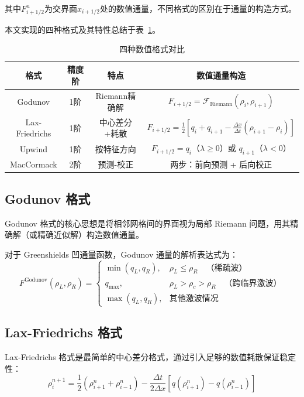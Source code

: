 \documentclass[12pt,a4paper]{ctexart}
\begin{document}
其中$F_{i+1/2}^n$为交界面$x_{i+1/2}$处的数值通量，不同格式的区别在于通量的构造方式。

本文实现的四种格式及其特性总结于表~\ref{tab:schemes}。

\begin{table}[H]
    \centering
    \caption{四种数值格式对比}
    \label{tab:schemes}
    \begin{tabular}{@{}cccc@{}}
        \toprule
        \textbf{格式} & \textbf{精度阶} & \textbf{特点} & \textbf{数值通量构造} \\
        \midrule
        Godunov & 1阶 & Riemann精确解 & $F_{i+1/2} = \mathcal{F}_{\text{Riemann}}(\rho_i, \rho_{i+1})$ \\
        Lax-Friedrichs & 1阶 & 中心差分+耗散 & $F_{i+1/2} = \frac{1}{2}[q_i+q_{i+1} - \frac{\Delta x}{\Delta t}(\rho_{i+1}-\rho_i)]$ \\
        Upwind & 1阶 & 按特征方向 & $F_{i+1/2} = q_i$（$\lambda \ge 0$）或 $q_{i+1}$（$\lambda < 0$） \\
        MacCormack & 2阶 & 预测-校正 & 两步：前向预测 + 后向校正 \\
        \bottomrule
    \end{tabular}
\end{table}

\subsection{Godunov 格式}

Godunov 格式的核心思想是将相邻网格间的界面视为局部 Riemann 问题，用其精确解（或精确近似解）构造数值通量。

对于 Greenshields 凹通量函数，Godunov 通量的解析表达式为：
\begin{equation}
    F^{\text{Godunov}}(\rho_L, \rho_R) = \begin{cases}
        \min(q_L, q_R), & \rho_L \le \rho_R \quad \text{（稀疏波）} \\
        q_{\max}, & \rho_L > \rho_c > \rho_R \quad \text{（跨临界激波）} \\
        \max(q_L, q_R), & \text{其他激波情况}
    \end{cases}
    \label{eq:godunov_flux}
\end{equation}

\subsection{Lax-Friedrichs 格式}

Lax-Friedrichs 格式是最简单的中心差分格式，通过引入足够的数值耗散保证稳定性：
\begin{equation}
    \rho_i^{n+1} = \frac{1}{2}(\rho_{i+1}^n + \rho_{i-1}^n) - \frac{\Delta t}{2\Delta x}\left[q(\rho_{i+1}^n) - q(\rho_{i-1}^n)\right]
\end{equation}
\end{document}
